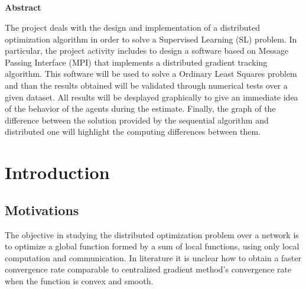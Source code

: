 \documentclass[a4paper,11pt,oneside]{book}
\begin{document}
\pagestyle{myheadings}



\newpage
\thispagestyle{empty}

\begin{center}
\chapter*{}
\thispagestyle{empty}
{\Huge \textbf{Abstract}}\\
\vspace{15mm}
\end{center}
The project deals with the design and implementation of a distributed
optimization algorithm in order to solve a Supervised Learning (SL) problem.
In particular, the project activity includes to design a software based on Message Passing Interface (MPI) that implements a distributed gradient tracking algorithm. This software will be used to solve a Ordinary Least Squares problem and than the results obtained will be validated through numerical tests over a given dataset. All results will be desplayed graphically to give an immediate idea of the behavior of the agents during the estimate. Finally, the graph of the difference between the solution provided by the sequential algorithm and distributed one will highlight the computing differences between them.

\tableofcontents \thispagestyle{empty}
\listoffigures\thispagestyle{empty}

\chapter*{Introduction}
\section*{Motivations} 
The objective in studying the distributed optimization problem over a network is to optimize a global function formed by a sum of local functions, using only local computation and communication.
In literature it is unclear how to obtain a faster convergence rate comparable to centralized gradient method's convergence rate when the function is convex and smooth. 
\end{document}
